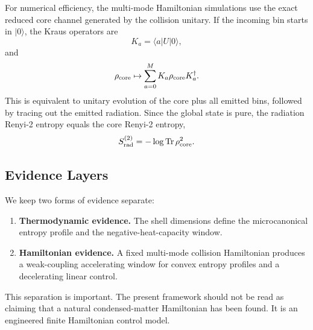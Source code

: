 For numerical efficiency, the multi-mode Hamiltonian simulations use the exact reduced core channel generated by the collision unitary. If the incoming bin starts in $|0\rangle$, the Kraus operators are
\begin{equation}
  K_a=\langle a|U|0\rangle,
\end{equation}
and
\begin{equation}
  \rho_{\rm core}\mapsto \sum_{a=0}^{M}K_a\rho_{\rm core}K_a^\dagger.
\end{equation}
This is equivalent to unitary evolution of the core plus all emitted bins, followed by tracing out the emitted radiation. Since the global state is pure, the radiation Renyi-2 entropy equals the core Renyi-2 entropy,
\begin{equation}
  S^{(2)}_{\rm rad}
  =
  -\log {\rm Tr}\,\rho_{\rm core}^2.
\end{equation}

\subsection{Evidence Layers}

We keep two forms of evidence separate:

\begin{enumerate}[leftmargin=*]
\item \textbf{Thermodynamic evidence.} The shell dimensions define the microcanonical entropy profile and the negative-heat-capacity window.
\item \textbf{Hamiltonian evidence.} A fixed multi-mode collision Hamiltonian produces a weak-coupling accelerating window for convex entropy profiles and a decelerating linear control.
\end{enumerate}

This separation is important. The present framework should not be read as claiming that a natural condensed-matter Hamiltonian has been found. It is an engineered finite Hamiltonian control model.
